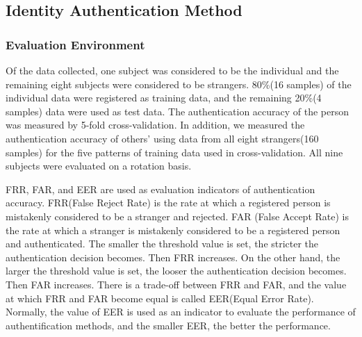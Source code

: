 \documentclass[sigchi,authordraft]{acmart}
\begin{document}
\subsection{Identity Authentication Method}
\subsubsection{Evaluation Environment}
Of the data collected, one subject was considered to be the individual and the remaining eight subjects were considered to be strangers. 80\%(16 samples) of the individual data were registered as training data, and the remaining 20\%(4 samples) data were used as test data. The authentication accuracy of the person was measured by 5-fold cross-validation. In addition, we measured the authentication accuracy of others' using data from all eight strangers(160 samples) for the five patterns of training data used in cross-validation. All nine subjects were evaluated on a rotation basis.\par


FRR, FAR, and EER are used as evaluation indicators of authentication accuracy. FRR(False Reject Rate) is the rate at which a registered person is mistakenly considered to be a stranger and rejected. FAR (False Accept Rate) is the rate at which a stranger is mistakenly considered to be a registered person and authenticated. The smaller the threshold value is set, the stricter the authentication decision becomes. Then FRR increases. On the other hand, the larger the threshold value is set, the looser the authentication decision becomes. Then FAR increases. There is a trade-off between FRR and FAR, and the value at which FRR and FAR become equal is called EER(Equal Error Rate). Normally, the value of EER is used as an indicator to evaluate the performance of authentification methods, and the smaller EER, the better the performance.

\end{document}
